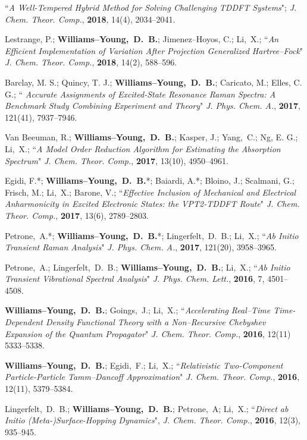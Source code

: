 \documentclass[10pt]{res} %
\newcommand*\me[0]{{\bf Williams--Young,~D.~B.}}
\newcommand*\xsli[0]{Li,~X.}
\newcommand*\cy[0]{Yang,~C.}
\begin{document}
\begin{resume}
\begin{etaremune}
        ``\emph{A Well-Tempered Hybrid Method for Solving Challenging 
	  TDDFT Systems}";
        \emph{J. Chem. Theor. Comp.}, \textbf{2018}, 14(4), 2034--2041.
  \item Lestrange, P.; \me; Jimenez--Hoyos, C.; \xsli;
        ``\emph{An Efficient Implementation of Variation After Projection 
	  Generalized Hartree--Fock}"
        \emph{J. Chem. Theor. Comp.}, \textbf{2018}, 14(2), 588--596.
  \item Barclay, M. S.; Quincy, T. J.; \me; Caricato, M.; Elles, C. G.;
        ``\emph{ Accurate Assignments of Excited-State Resonance Raman 
                 Spectra: A Benchmark Study Combining Experiment and 
                 Theory}"
        \emph{J. Phys. Chem. A.}, \textbf{2017}, 121(41), 7937--7946.
  \item Van Beeuman, R.; \me; Kasper, J.; \cy; Ng, E. G.; \xsli;
        ``\emph{A Model Order Reduction Algorithm for Estimating the 
	        Absorption Spectrum}"
        \emph{J. Chem. Theor. Comp.}, \textbf{2017}, 13(10), 4950--4961.
  \item Egidi, F.*; \me*; Baiardi, A.*; Bloino, J.; Scalmani, G.; Frisch, M.; 
        \xsli; Barone, V.; 
        ``\emph{Effective Inclusion of Mechanical and Electrical Anharmonicity in 
                Excited Electronic States: the VPT2-TDDFT Route}"
          \emph{J. Chem. Theor. Comp.}, \textbf{2017}, 13(6), 2789--2803.
  \item Petrone,~A.*; \me*; Lingerfelt,~D.~B.; \xsli;
        ``\emph{Ab Initio Transient Raman Analysis}"
	  \emph{J. Phys. Chem. A.}, \textbf{2017}, 121(20), 3958--3965.
  \item Petrone,~A.; Lingerfelt,~D.~B.; \me; \xsli;
        ``\emph{Ab Initio Transient Vibrational Spectral Analysis}"
	  \emph{J. Phys. Chem. Lett.}, \textbf{2016}, 7, 4501--4508.
  \item \me; Goings,~J.; \xsli;
	``\emph{Accelerating Real--Time Time-Dependent Density Functional Theory 
	        with a Non--Recursive Chebyshev Expansion of the Quantum 
                Propagator}"
	  \emph{J. Chem. Theor. Comp.}, \textbf{2016}, 12(11) 5333--5338.
  \item \me; Egidi,~F.; \xsli;
	``\emph{Relativistic Two-Component Particle-Particle Tamm--Dancoff 
	        Approximation}"
	  \emph{J. Chem. Theor. Comp.}, \textbf{2016}, 12(11), 5379--5384.
  \item Lingerfelt,~D.~B.; \me; Petrone,~A; \xsli; 
        ``\emph{Direct ab Initio (Meta-)Surface-Hopping Dynamics}", 
        \emph{J. Chem. Theor. Comp.}, \textbf{2016}, 12(3), 935--945.
\end{etaremune}
%


\end{resume}
\end{document}
